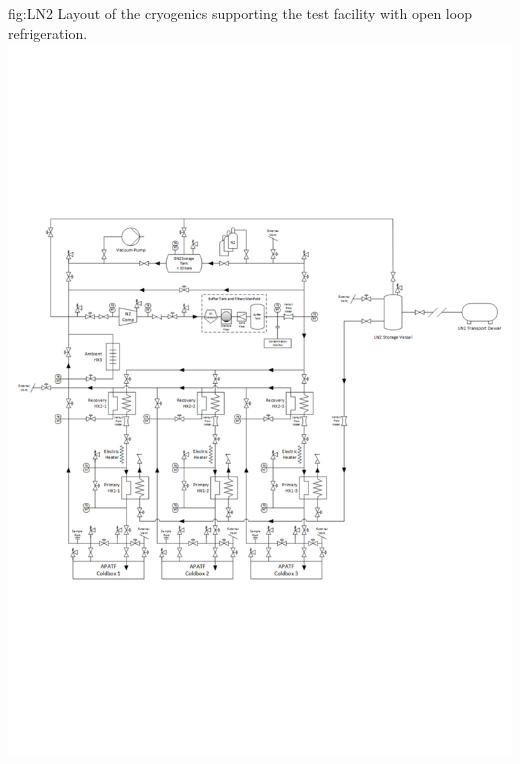 \begin{dunefigure}{fig:LN2}
  {Layout of the cryogenics supporting the  test facility with open loop refrigeration.}
\includegraphics[width=.98\textwidth]{graphics/Cryo-cold-box-LN2.pdf}
\end{dunefigure}



